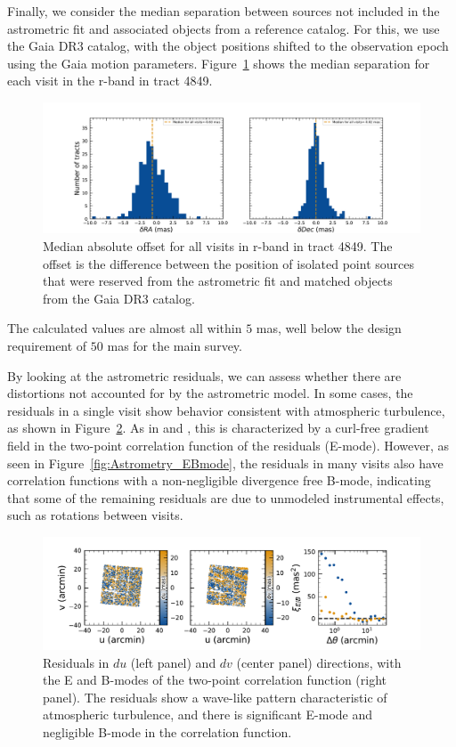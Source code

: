 Finally, we consider the median separation between sources not included in the astrometric fit and associated objects from a reference catalog.
For this, we use the Gaia \gls{DR3} catalog, with the object positions shifted to the observation epoch using the Gaia motion parameters.
Figure~\ref{fig:AA1} shows the median separation for each visit in the r-band in \gls{tract} 4849.
\begin{figure}[htb!]
\centering
\includegraphics[width=0.98\linewidth]{Astrometry_AA1.pdf}
\caption{Median absolute offset for all visits in r-band in \gls{tract} 4849. The offset is the difference between the position of isolated point sources that were reserved from the astrometric fit and matched objects from the Gaia DR3 catalog.}
\label{fig:AA1}
\vspace{0.1cm}
\end{figure}


The calculated values are almost all within $5$\xspace mas, well below the design requirement of $50$\xspace mas for the main survey.

By looking at the astrometric residuals, we can assess whether there are distortions not accounted for by the astrometric model.
In some cases, the residuals in a single visit show behavior consistent with atmospheric turbulence, as shown in Figure~\ref{fig:Astrometry_Emode}.
As in \citet{Leget2021} and \citet{Fortino2021}, this is characterized by a curl-free gradient field in the two-point correlation function of the residuals (E-mode). However, as seen in Figure~\ref{fig:Astrometry_EBmode}, the residuals in many visits also have correlation functions with a non-negligible divergence free B-mode, indicating that some of the remaining residuals are due to unmodeled instrumental effects, such as rotations between visits.
\begin{figure}[htb!]
\centering
\includegraphics[width=0.98\linewidth]{figures/Astrometry_2024120200359.pdf}
\caption{\small Residuals in $du$ (left panel) and $dv$ (center panel) directions, with the E and \gls{B}-modes of the two-point correlation function (right panel). The residuals show a wave-like pattern characteristic of atmospheric turbulence, and there is significant E-mode and negligible \gls{B}-mode in the correlation function.}
\label{fig:Astrometry_Emode}
\vspace{0.1cm}
\end{figure}


